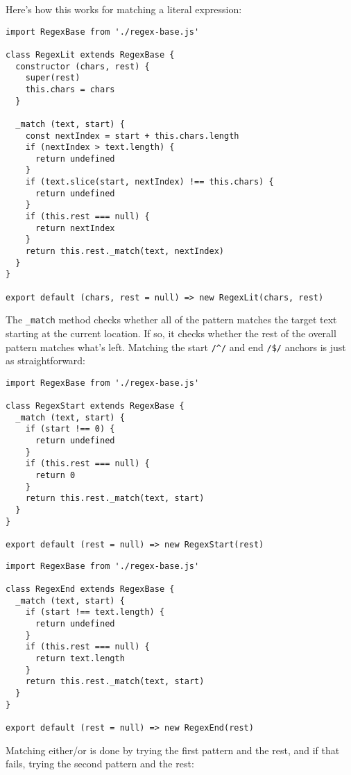 \documentclass[krantzl]{krantz}
\begin{document}
Here’s how this works for matching a literal expression:


\begin{lstlisting}[frame=tblr]
import RegexBase from './regex-base.js'

class RegexLit extends RegexBase {
  constructor (chars, rest) {
    super(rest)
    this.chars = chars
  }

  _match (text, start) {
    const nextIndex = start + this.chars.length
    if (nextIndex > text.length) {
      return undefined
    }
    if (text.slice(start, nextIndex) !== this.chars) {
      return undefined
    }
    if (this.rest === null) {
      return nextIndex
    }
    return this.rest._match(text, nextIndex)
  }
}

export default (chars, rest = null) => new RegexLit(chars, rest)
\end{lstlisting}



\noindent The \texttt{\_match} method checks whether all of the pattern matches the target text starting at the current location.
If so, it checks whether the rest of the overall pattern matches what’s left.
Matching the start \texttt{/{\textasciicircum}/} and end \texttt{/\$/} anchors is just as straightforward:


\begin{lstlisting}[frame=tblr]
import RegexBase from './regex-base.js'

class RegexStart extends RegexBase {
  _match (text, start) {
    if (start !== 0) {
      return undefined
    }
    if (this.rest === null) {
      return 0
    }
    return this.rest._match(text, start)
  }
}

export default (rest = null) => new RegexStart(rest)
\end{lstlisting}



\begin{lstlisting}[frame=tblr]
import RegexBase from './regex-base.js'

class RegexEnd extends RegexBase {
  _match (text, start) {
    if (start !== text.length) {
      return undefined
    }
    if (this.rest === null) {
      return text.length
    }
    return this.rest._match(text, start)
  }
}

export default (rest = null) => new RegexEnd(rest)
\end{lstlisting}



Matching either/or is done by trying the first pattern and the rest,
and if that fails,
trying the second pattern and the rest:
\end{document}
